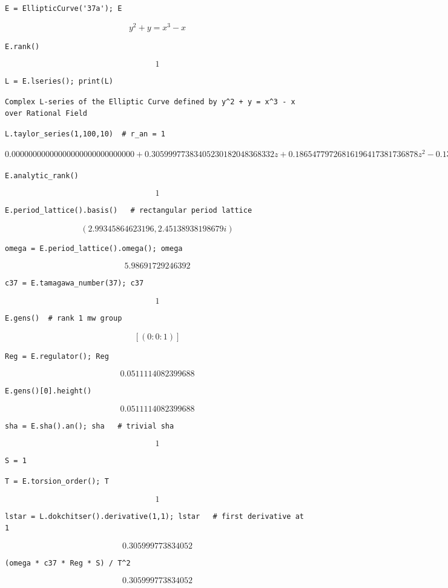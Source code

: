\documentclass{book}
\begin{document}
\begin{lstlisting}
E = EllipticCurve('37a'); E
\end{lstlisting}$$y^2 + y = x^{3} -  x $$
\begin{lstlisting}
E.rank()
\end{lstlisting}$$1$$
\begin{lstlisting}
L = E.lseries(); print(L)
\end{lstlisting}\begin{verbatim}Complex L-series of the Elliptic Curve defined by y^2 + y = x^3 - x over Rational Field\end{verbatim}
\begin{lstlisting}
L.taylor_series(1,100,10)  # r_an = 1
\end{lstlisting}$$0.00000000000000000000000000000 + 0.30599977383405230182048368332z + 0.18654779726816196417381736878z^{2} - 0.13679146309718766630258221643z^{3} + 0.016106646849640053505097729457z^{4} + 0.018595517539880219615300779472z^{5} - 0.011815619832614466303556313944z^{6} + 0.0032632569120762634561786706023z^{7} - 0.00018033754779936743478345006461z^{8} - 0.00024611138597486162556659985584z^{9} + O(z^{10})$$
\begin{lstlisting}
E.analytic_rank()
\end{lstlisting}$$1$$
\begin{lstlisting}
E.period_lattice().basis()   # rectangular period lattice
\end{lstlisting}$$\left(2.99345864623196, 2.45138938198679i\right)$$
\begin{lstlisting}
omega = E.period_lattice().omega(); omega
\end{lstlisting}$$5.98691729246392$$
\begin{lstlisting}
c37 = E.tamagawa_number(37); c37
\end{lstlisting}$$1$$
\begin{lstlisting}
E.gens()  # rank 1 mw group
\end{lstlisting}$$\left[\left(0 : 0 : 1\right)\right]$$
\begin{lstlisting}
Reg = E.regulator(); Reg
\end{lstlisting}$$0.0511114082399688$$
\begin{lstlisting}
E.gens()[0].height()
\end{lstlisting}$$0.0511114082399688$$
\begin{lstlisting}
sha = E.sha().an(); sha   # trivial sha
\end{lstlisting}$$1$$
\begin{lstlisting}
S = 1
\end{lstlisting}
\begin{lstlisting}
T = E.torsion_order(); T
\end{lstlisting}$$1$$
\begin{lstlisting}
lstar = L.dokchitser().derivative(1,1); lstar   # first derivative at 1
\end{lstlisting}$$0.305999773834052$$
\begin{lstlisting}
(omega * c37 * Reg * S) / T^2
\end{lstlisting}$$0.305999773834052$$
\end{document}
